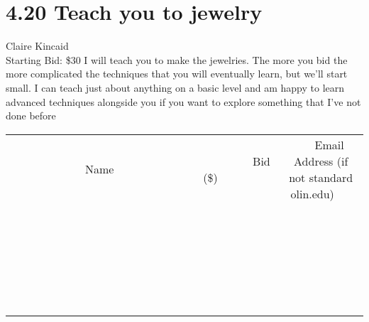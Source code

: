 \documentclass[11pt]{article}
\begin{document}
\section*{4.20 Teach you to jewelry}
Claire Kincaid
\\
Starting Bid: \$30
\newline
I will teach you to make the jewelries.  The more you bid the more complicated the techniques that you will eventually learn, but we'll start small.  I can teach just about anything on a basic level and am happy to learn advanced techniques alongside you if you want to explore something that I've not done before
\\[6ex]
\begin{tabular}{c c c}
~~~~~~~~~~~~~Name~~~~~~~~~~~~~ & ~~~~~~~~~Bid (\$)~~~~~~~~~  & ~~~Email Address (if not standard olin.edu)~~~\\
 & & \\
\hline
 & & \\
\hline
 & & \\
\hline
 & & \\
\hline
 & & \\
\hline
 & & \\
\hline
 & & \\
\hline
 & & \\
\hline
 & & \\
\hline
 & & \\
\hline
 & & \\
\hline
 & & \\
\hline
 & & \\
\hline
 & & \\
\hline
 & & \\
\hline
 & & \\
\hline
 & & \\
\hline
 & & \\
\hline
 & & \\
\hline
 & & \\
\hline
 & & \\
\hline
 & & \\
\hline
 & & \\
\hline
 & & \\
\hline
 & & \\
\hline
 & & \\
\hline
\end{tabular}
\newpage
\end{document}
